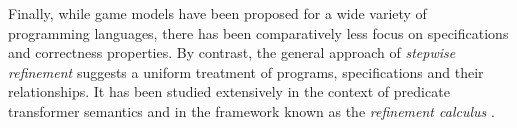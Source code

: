 \documentclass[sigplan,screen]{acmart}
\newcommand{\hlc}[2][yellow]{ {\sethlcolor{#1} \hl{#2}} }
\newcommand\zhong[1]{\hlc[yellow]{[Zhong: #1]}}
\begin{document}
Finally,
while game models have been proposed
for a wide variety of programming languages,
there has been comparatively less focus
on specifications and correctness properties.
By contrast,
the general approach of \emph{stepwise refinement}
suggests a uniform treatment of programs, specifications
and their relationships.
It has been studied extensively in the context of
predicate transformer semantics \cite{gc}
and in the framework known as the \emph{refinement calculus} \cite{refcal}.

%
%
%
%

\end{document}
